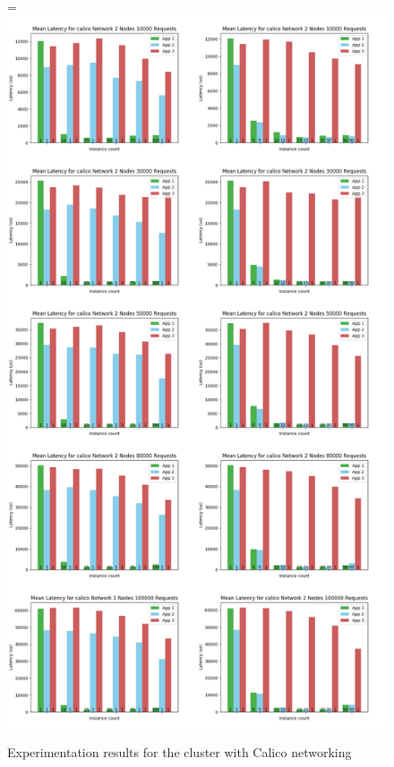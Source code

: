 \documentclass[12pt,oneandhalf,chaparabic,ceng,ms,eng,oneside,pntc]{gsufbe}
\makeatletter
\let\old@includegraphics\includegraphics
\renewcommand{\includegraphics}[2][,]{%
  \setbox9=\hbox{\old@includegraphics[#1]{#2}}%
  \ifdim\wd9>\textwidth
    \old@includegraphics[#1,width=\textwidth]{#2}%
  \else
    \old@includegraphics[#1]{#2}%
  \fi%
}
\makeatother
\begin{document}
\begin{figure}
\centering
\includegraphics[]{calico.png}
\caption{Experimentation results for the cluster with Calico networking}
\label{calico}
\end{figure}
\end{document}
